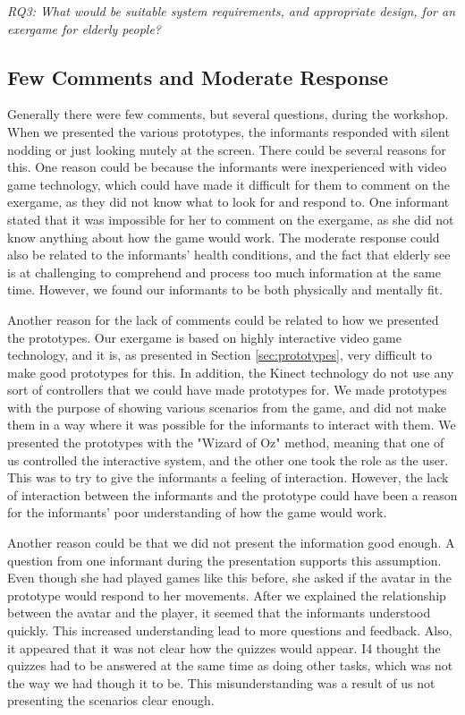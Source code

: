 \emph{RQ3: What would be suitable system requirements, and appropriate design, for an exergame for elderly people?}

\subsection{Few Comments and Moderate Response}
Generally there were few comments, but several questions, during the workshop. When we presented the various prototypes, the informants responded with silent nodding or just looking mutely at the screen. There could be several reasons for this. One reason could be because the informants were inexperienced with video game technology, which could have made it difficult for them to comment on the exergame, as they did not know what to look for and respond to. One informant stated that it was impossible for her to comment on the exergame, as she did not know anything about how the game would work. The moderate response could also be related to the informants' health conditions, and the fact that elderly see is at challenging to comprehend and process too much information at the same time. However, we found our informants to be both physically and mentally fit. 

Another reason for the lack of comments could be related to how we presented the prototypes. Our exergame is based on highly interactive video game technology, and it is, as presented in Section \ref{sec:prototypes}, very difficult to make good prototypes for this. In addition, the Kinect technology do not use any sort of controllers that we could have made prototypes for. We made prototypes with the purpose of showing various scenarios from the game, and did not make them in a way where it was possible for the informants to interact with them. We presented the prototypes with the "Wizard of Oz" method, meaning that one of us controlled the interactive system, and the other one took the role as the user. This was to try to give the informants a feeling of interaction. However, the lack of interaction between the informants and the prototype could have been a reason for the informants' poor understanding of how the game would work. 

Another reason could be that we did not present the information good enough. A question from one informant during the presentation supports this assumption. Even though she had played games like this before, she asked if the avatar in the prototype would respond to her movements. After we explained the relationship between the avatar and the player, it seemed that the informants understood quickly. This increased understanding lead to more questions and feedback. Also, it appeared that it was not clear how the quizzes would appear. I4 thought the quizzes had to be answered at the same time as doing other tasks, which was not the way we had though it to be. This misunderstanding was a result of us not presenting the scenarios clear enough.

